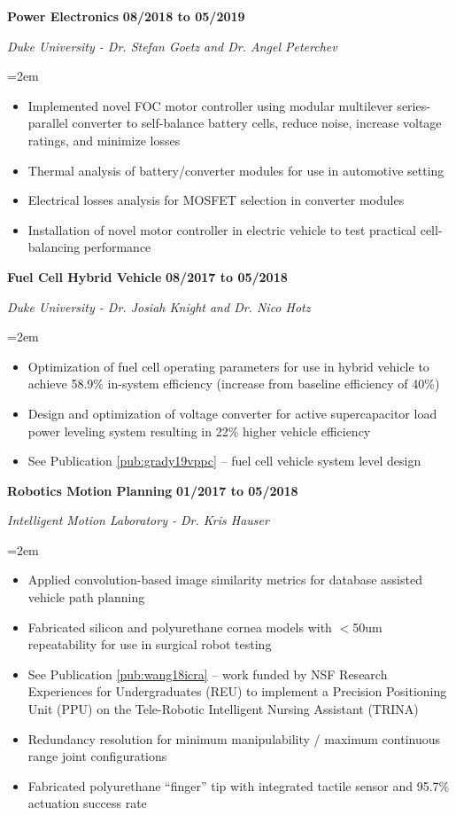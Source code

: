 \documentclass[paper=letter,fontsize=11pt]{scrartcl} %
\newcommand{\sepspace}{\vspace*{0em}}		%
\newcommand{\EducationEntry}[4]{
		\noindent \textbf{#1} \hfill      %
		\colorbox{White}{%
			\bf 
			\parbox{10em}{%
			\hfill\color{Black}#2}} \par  %
		\noindent \textit{#3} \par        %
		\noindent\hangindent=2em\hangafter=0 \small #4 %
		\normalsize \par}
\newcommand{\WorkEntry}[4]{				  %
		\noindent \textbf{#1} \hfill      %
		\colorbox{White}{\bf \color{Black}#2} \par  %
		\noindent \textit{#3} \par              %
		\noindent\hangindent=2em\hangafter=0 \small #4 %
		\normalsize \par}
\begin{document}
\WorkEntry{Power Electronics}{08/2018 to 05/2019}{Duke University - Dr. Stefan Goetz and Dr. Angel Peterchev}{
	\begin{itemize}
		\item Implemented novel FOC motor controller using modular multilever series-parallel converter to self-balance battery cells, reduce noise, increase voltage ratings, and minimize losses
		\item Thermal analysis of battery/converter modules for use in automotive setting
		\item Electrical losses analysis for MOSFET selection in converter modules
		\item Installation of novel motor controller in electric vehicle to test practical cell-balancing performance
	\end{itemize}
}
\sepspace

\WorkEntry{Fuel Cell Hybrid Vehicle}{08/2017 to 05/2018}{Duke University - Dr. Josiah Knight and Dr. Nico Hotz}{
	\begin{itemize}
		\item Optimization of fuel cell operating parameters for use in hybrid vehicle to achieve 58.9\% in-system efficiency (increase from baseline efficiency of 40\%)
		\item Design and optimization of voltage converter for active supercapacitor load power leveling system resulting in 22\% higher vehicle efficiency
		\item See Publication \ref{pub:grady19vppc} -- fuel cell vehicle system level design %
	\end{itemize}
}
\sepspace

\WorkEntry{Robotics Motion Planning}{01/2017 to 05/2018}{Intelligent Motion Laboratory - Dr. Kris Hauser}{
	\begin{itemize}
		\item Applied convolution-based image similarity metrics for database assisted vehicle path planning
		\item Fabricated silicon and polyurethane cornea models with $<$50um repeatability for use in surgical robot testing
		\item See Publication \ref{pub:wang18icra} -- work funded by NSF Research Experiences for Undergraduates (REU) to implement a Precision Positioning Unit (PPU) on the Tele-Robotic Intelligent Nursing Assistant (TRINA)
		\item Redundancy resolution for minimum manipulability / maximum continuous range joint configurations
		\item Fabricated polyurethane “finger” tip with integrated tactile sensor and 95.7\% actuation success rate
	\end{itemize}
}
\end{document}
